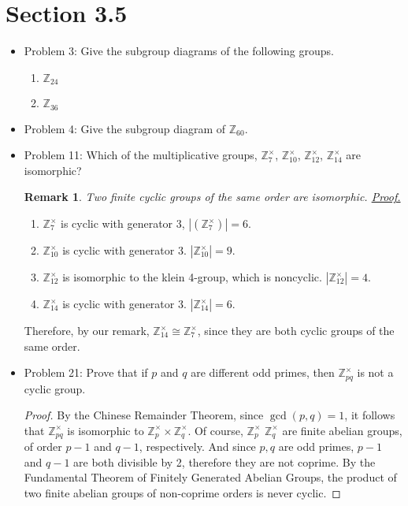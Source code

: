 \documentclass[hidelinks,12pt]{article}
\title{\scalebox{2}{Math 531 Homework 6}}
\author{\scalebox{1.5}{Theo Koss}}
\date{March 2021}
\newtheorem*{remark}{Remark}
\newcommand{\Z}{\mathbb{Z}}
\begin{document}
\maketitle
\section{Section 3.5}
\begin{itemize}
\item Problem 3: Give the subgroup diagrams of the following groups.\begin{enumerate}[label=(\alph*)]
    \item $\Z_{24}$\newline{}
    \item $\Z_{36}$\newline{}
\end{enumerate}
\item Problem 4: Give the subgroup diagram of $\Z_{60}$.\newline{}
\item Problem 11: Which of the multiplicative groups, $\Z^{\times}_7$, $\Z^{\times}_{10}$, $\Z^{\times}_{12}$, $\Z^{\times}_{14}$ are isomorphic?\newline \begin{remark}Two finite cyclic groups of the same order are isomorphic. \href{https://proofwiki.org/wiki/Cyclic_Groups_of_Same_Order_are_Isomorphic}{\color{cyan}Proof.} \end{remark}\begin{enumerate}
    \item $\Z^{\times}_7$ is cyclic with generator 3, $|(\Z^{\times}_7)|=6$.
    \item $\Z^{\times}_{10}$ is cyclic with generator 3. $|\Z^{\times}_{10}|=9$.
    \item $\Z^{\times}_{12}$ is isomorphic to the klein 4-group, which is noncyclic. $|\Z^{\times}_{12}|=4$.
    \item $\Z^{\times}_{14}$ is cyclic with generator 3. $|\Z^{\times}_{14}|=6$.
\end{enumerate}Therefore, by our remark, $\Z^{\times}_{14}\cong\Z^{\times}_7$, since they are both cyclic groups of the same order.
\item Problem 21: Prove that if $p$ and $q$ are different odd primes, then $\Z^{\times}_{pq}$ is not a cyclic group.\begin{proof} By the Chinese Remainder Theorem, since $\gcd(p,q)=1$, it follows that $\Z^{\times}_{pq}$ is isomorphic to $\Z^{\times}_p\times\Z^{\times}_q$. Of course, $\Z^{\times}_p$ $\Z^{\times}_q$ are finite abelian groups, of order $p-1$ and $q-1$, respectively. And since $p,q$ are odd primes, $p-1$ and $q-1$ are both divisible by 2, therefore they are not coprime. By the Fundamental Theorem of Finitely Generated Abelian Groups, the product of two finite abelian groups of non-coprime orders is never cyclic. 
\end{proof}
\end{itemize}
\end{document}
